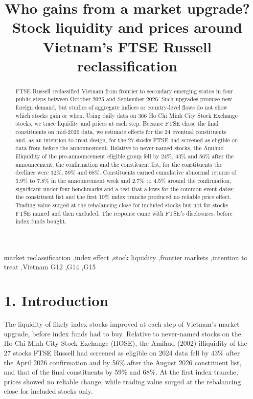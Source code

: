 \documentclass[review,authoryear,12pt]{elsarticle}
\begin{document}
\begin{frontmatter}
\title{Who gains from a market upgrade? Stock liquidity and prices around
Vietnam's FTSE Russell reclassification}
\begin{abstract}
FTSE Russell reclassified Vietnam from frontier to secondary emerging
status in four public steps between October 2025 and September 2026.
Such upgrades promise new foreign demand, but studies of aggregate
indices or country-level flows do not show which stocks gain or when.
Using daily data on 366 Ho Chi Minh City Stock Exchange stocks, we trace
liquidity and prices at each step. Because FTSE chose the final
constituents on mid-2026 data, we estimate effects for the 24 eventual
constituents and, as an intention-to-treat design, for the 27 stocks
FTSE had screened as eligible on data from before the announcement.
Relative to never-named stocks, the Amihud illiquidity of the
pre-announcement eligible group fell by 24\%, 43\% and 56\% after the
announcement, the confirmation and the constituent list; for the
constituents the declines were 32\%, 59\% and 68\%. Constituents earned
cumulative abnormal returns of 3.9\% to 7.8\% in the announcement week
and 2.7\% to 4.5\% around the confirmation, significant under four
benchmarks and a test that allows for the common event dates; the
constituent list and the first 10\% index tranche produced no reliable
price effect. Trading value surged at the rebalancing close for included
stocks but not for stocks FTSE named and then excluded. The response
came with FTSE's disclosures, before index funds bought.
\end{abstract}
\begin{keyword}
market reclassification \sep index effect \sep stock liquidity \sep frontier markets \sep intention to treat \sep Vietnam
\JEL G12 \sep G14 \sep G15
\end{keyword}
\end{frontmatter}
\doublespacing
\hypertarget{introduction}{%
\section*{1. Introduction}}

The liquidity of likely index stocks improved at each step of Vietnam's
market upgrade, before index funds had to buy. Relative to never-named
stocks on the Ho Chi Minh City Stock Exchange (HOSE), the Amihud (2002)
illiquidity of the 27 stocks FTSE Russell had screened as eligible on
2024 data fell by 43\% after the April 2026 confirmation and by 56\%
after the August 2026 constituent list, and that of the final
constituents by 59\% and 68\%. At the first index tranche, prices showed
no reliable change, while trading value surged at the rebalancing close
for included stocks only.
\end{document}

